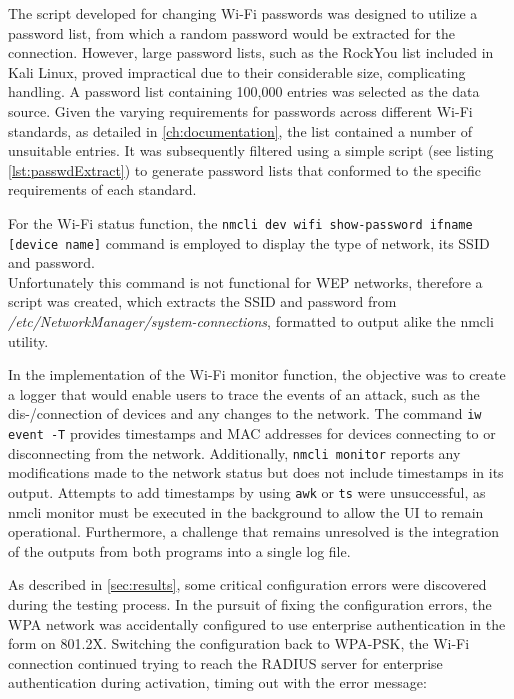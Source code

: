 The script developed for changing Wi-Fi passwords was designed to utilize a password list, from which a random password would be extracted for the connection. 
However, large password lists, such as the RockYou list included in Kali Linux, proved impractical due to their considerable size, complicating handling.
A password list containing 100,000 entries was selected as the data source. 
Given the varying requirements for passwords across different Wi-Fi standards, as detailed in \cref{ch:documentation}, the list contained a number of unsuitable entries.
It was subsequently filtered using a simple script (see listing \ref{lst:passwdExtract}) to generate password lists that conformed to the specific requirements of each standard.



For the Wi-Fi status function, the \lstinline[breaklines=true]|nmcli dev wifi show-password ifname [device name]| command is employed to display the type of network, its SSID and password.
\\Unfortunately this command is not functional for WEP networks, therefore a script was created, which extracts the SSID and password from \textit{/etc/NetworkManager/system-connections}, formatted to output alike the nmcli utility.

In the implementation of the Wi-Fi monitor function, the objective was to create a logger that would enable users to trace the events of an attack, such as the dis-/connection of devices and any changes to the network.
The command \lstinline[]|iw event -T| provides timestamps and MAC addresses for devices connecting to or disconnecting from the network. 
Additionally, \lstinline[]|nmcli monitor| reports any modifications made to the network status but does not include timestamps in its output. 
Attempts to add timestamps by using \lstinline[]|awk| or \lstinline[]|ts| were unsuccessful, as nmcli monitor must be executed in the background to allow the UI to remain operational. 
Furthermore, a challenge that remains unresolved is the integration of the outputs from both programs into a single log file.

As described in \cref{sec:results}, some critical configuration errors were discovered during the testing process.
In the pursuit of fixing the configuration errors, the WPA network was accidentally configured to use enterprise authentication in the form on 801.2X.
Switching the configuration back to WPA-PSK, the Wi-Fi connection continued trying to reach the RADIUS server for enterprise authentication during activation, timing out with the error message:


